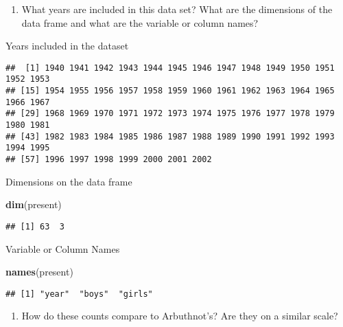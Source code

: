 \documentclass[]{article}
\newenvironment{Shaded}{\begin{snugshade}}{\end{snugshade}}
\newcommand{\KeywordTok}[1]{\textcolor[rgb]{0.13,0.29,0.53}{\textbf{#1}}}
\newcommand{\NormalTok}[1]{#1}
\newcommand{\OperatorTok}[1]{\textcolor[rgb]{0.81,0.36,0.00}{\textbf{#1}}}
\providecommand{\tightlist}{%
  \setlength{\itemsep}{0pt}\setlength{\parskip}{0pt}}
\begin{document}
\begin{enumerate}
\def\labelenumi{\arabic{enumi}.}
\tightlist
\item
  What years are included in this data set? What are the dimensions of
  the data frame and what are the variable or column names?
\end{enumerate}

Years included in the dataset

\begin{Shaded}
\end{Shaded}

\begin{verbatim}
##  [1] 1940 1941 1942 1943 1944 1945 1946 1947 1948 1949 1950 1951 1952 1953
## [15] 1954 1955 1956 1957 1958 1959 1960 1961 1962 1963 1964 1965 1966 1967
## [29] 1968 1969 1970 1971 1972 1973 1974 1975 1976 1977 1978 1979 1980 1981
## [43] 1982 1983 1984 1985 1986 1987 1988 1989 1990 1991 1992 1993 1994 1995
## [57] 1996 1997 1998 1999 2000 2001 2002
\end{verbatim}

Dimensions on the data frame

\begin{Shaded}
\begin{Highlighting}[]
\KeywordTok{dim}\NormalTok{(present)}
\end{Highlighting}
\end{Shaded}

\begin{verbatim}
## [1] 63  3
\end{verbatim}

Variable or Column Names

\begin{Shaded}
\begin{Highlighting}[]
\KeywordTok{names}\NormalTok{(present)}
\end{Highlighting}
\end{Shaded}

\begin{verbatim}
## [1] "year"  "boys"  "girls"
\end{verbatim}

\begin{enumerate}
\def\labelenumi{\arabic{enumi}.}
\setcounter{enumi}{1}
\tightlist
\item
  How do these counts compare to Arbuthnot's? Are they on a similar
  scale?
\end{enumerate}
\end{document}
